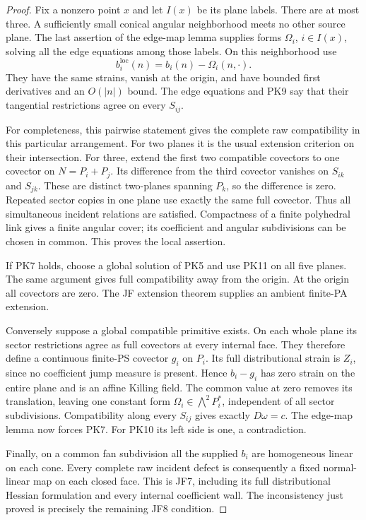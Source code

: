 \begin{proof}
Fix a nonzero point \(x\) and let \(I(x)\) be its plane labels.
There are at most three.  A sufficiently small conical angular
neighborhood meets no other source plane.  The last assertion
of the edge-map lemma supplies forms \(\Omega_i\),
\(i\in I(x)\), solving all the edge equations among those
labels.  On this neighborhood use
\[
                       b_i^{\mathrm{loc}}(n)
                                  =b_i(n)-\Omega_i(n,\cdot).
 \tag{PK11}
\]
They have the same strains, vanish at the origin, and have
bounded first derivatives and an \(O(|n|)\) bound.
The edge equations and PK9 say that their tangential
restrictions agree on every \(S_{ij}\).

For completeness, this pairwise statement gives the complete
raw compatibility in this particular arrangement.  For two
planes it is the usual extension criterion on their intersection.
For three, extend the first two compatible covectors to one
covector on \(N=P_i+P_j\).  Its difference from the third
covector vanishes on \(S_{ik}\) and \(S_{jk}\).  These are
distinct two-planes spanning \(P_k\), so the difference is
zero.  Repeated sector copies in one plane use exactly the
same full covector.  Thus all simultaneous incident relations
are satisfied.  Compactness of a finite polyhedral link gives
a finite angular cover; its coefficient and angular subdivisions
can be chosen in common.  This proves the local assertion.

If PK7 holds, choose a global solution of PK5 and use PK11
on all five planes.  The same argument gives full compatibility
away from the origin.  At the origin all covectors are zero.
The JF extension theorem supplies an ambient finite-PA extension.

Conversely suppose a global compatible primitive exists.  On
each whole plane its sector restrictions agree as full covectors
at every internal face.  They therefore define a continuous
finite-PS covector \(g_i\) on \(P_i\).  Its full distributional
strain is \(Z_i\), since no coefficient jump measure is present.
Hence \(b_i-g_i\) has zero strain on the entire plane and is
an affine Killing field.  The common value at zero removes
its translation, leaving one constant form
\(\Omega_i\in\bigwedge^2P_i^*\), independent of all sector
subdivisions.  Compatibility along every \(S_{ij}\) gives
exactly \(D\omega=c\).  The edge-map lemma now forces PK7.
For PK10 its left side is one, a contradiction.

Finally, on a common fan subdivision all the supplied \(b_i\)
are homogeneous linear on each cone.  Every complete raw
incident defect is consequently a fixed normal-linear map on
each closed face.  This is JF7, including its full distributional
Hessian formulation and every internal coefficient wall.  The
inconsistency just proved is precisely the remaining JF8
condition.
\end{proof}

